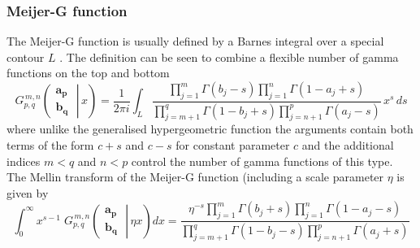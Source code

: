 \documentclass[journal=jcisd8,manuscript=article,layout=onecolumn,pdftex,floatfix,amsmath,amssymb,10pt]{achemso}
\begin{document}
\subsubsection{Meijer-G function}
The Meijer-G function is usually defined by a Barnes integral over a special contour $L$ \cite{}. The definition can be seen to combine a flexible number of gamma functions on the top and bottom
\begin{equation}
G_{p,q}^{\,m,n} \!\left( \left. \begin{matrix} \mathbf{a_p} \\ \mathbf{b_q} \end{matrix} \; \right| \, x \right) = \frac{1}{2 \pi i} \int_L \frac{\prod_{j=1}^m \Gamma(b_j - s) \prod_{j=1}^n \Gamma(1 - a_j +s)} {\prod_{j=m+1}^q \Gamma(1 - b_j + s) \prod_{j=n+1}^p \Gamma(a_j - s)} \,x^s \,ds
\end{equation}
where unlike the generalised hypergeometric function the arguments contain both terms of the form $c+s$ and $c-s$ for constant parameter $c$ and the additional indices $m<q$ and $n<p$ control the number of gamma functions of this type. The Mellin transform of the Meijer-G function (including a scale parameter $\eta$ is given by
\begin{equation}
\int_0^{\infty} x^{s - 1} \; G_{p,q}^{\,m,n} \!\left( \left. \begin{matrix} \mathbf{a_p} \\ \mathbf{b_q} \end{matrix} \; \right| \, \eta x \right) dx =
\frac{\eta^{-s} \prod_{j = 1}^{m} \Gamma (b_j + s) \prod_{j = 1}^{n} \Gamma (1 - a_j - s)} {\prod_{j = m + 1}^{q} \Gamma (1 - b_j - s) \prod_{j = n + 1}^{p} \Gamma (a_j + s)}
\end{equation}

\end{document}
